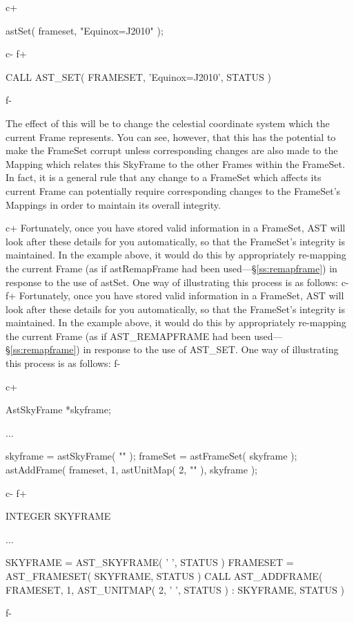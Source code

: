 \documentclass[twoside,11pt]{starlink}
\providecommand{\secref}[1]{\S\ref{#1}}
\begin{document}
{c+
\small
\begin{terminalv}
astSet( frameset, "Equinox=J2010" );
\end{terminalv}
\normalsize
c-
f+
\small
\begin{terminalv}
      CALL AST_SET( FRAMESET, 'Equinox=J2010', STATUS )
\end{terminalv}
\normalsize
f-

The effect of this will be to change the celestial coordinate system
which the current Frame represents. You can see, however, that this
has the potential to make the FrameSet corrupt unless corresponding
changes are also made to the Mapping which relates this SkyFrame to
the other Frames within the FrameSet. In fact, it is a general rule
that any change to a FrameSet which affects its current Frame can
potentially require corresponding changes to the FrameSet's Mappings
in order to maintain its overall integrity.

c+
Fortunately, once you have stored valid information in a FrameSet, AST
will look after these details for you automatically, so that the
FrameSet's integrity is maintained. In the example above, it would do
this by appropriately re-mapping the current Frame (as if
astRemapFrame had been used---\secref{ss:remapframe}) in response to
the use of astSet. One way of illustrating this process is as follows:
c-
f+
Fortunately, once you have stored valid information in a FrameSet, AST
will look after these details for you automatically, so that the
FrameSet's integrity is maintained. In the example above, it would do
this by appropriately re-mapping the current Frame (as if
AST\_REMAPFRAME had been used---\secref{ss:remapframe}) in response to
the use of AST\_SET. One way of illustrating this process is as
follows:
f-

c+
\small
\begin{terminalv}
AstSkyFrame *skyframe;

...

skyframe = astSkyFrame( "" );
frameSet = astFrameSet( skyframe );
astAddFrame( frameset, 1, astUnitMap( 2, "" ), skyframe );
\end{terminalv}
\normalsize
c-
f+
\small
\begin{terminalv}
      INTEGER SKYFRAME

      ...

      SKYFRAME = AST_SKYFRAME( ' ', STATUS )
      FRAMESET = AST_FRAMESET( SKYFRAME, STATUS )
      CALL AST_ADDFRAME( FRAMESET, 1, AST_UNITMAP( 2, ' ', STATUS )
     :                   SKYFRAME, STATUS )
\end{terminalv}
\normalsize
f-

}
\end{document}
